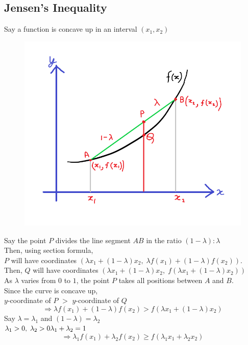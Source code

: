 \documentclass[14]{article}
\theoremstyle{definition}
\theoremstyle{case}
\begin{document}
\subsection{Jensen's Inequality}
Say a function is concave up in an interval $(x_1, x_2)$\\
\begin{figure}[h]
\includegraphics[scale=0.417]{images/jensen}
\end{figure}
Say the point $P$ divides the line segment $AB$ in the ratio $(1 - \lambda):\lambda$\\
Then, using section formula,\\
$P$ will have coordinates 
$\left( \lambda x_1 + (1 - \lambda) x_2,\; \lambda f(x_1) + (1 - \lambda) f(x_2) \right)$.\\
Then, $Q$ will have coordinates $\left( \lambda x_1 + (1 - \lambda) x_2,\; f\left(\lambda x_1 + (1 - \lambda) x_2\right) \right)$\\
As $\lambda$ varies from $0$ to $1$, the point $P$ takes all positions between $A$ and $B$.\\
Since the curve is concave up,\\
$y$-coordinate of $P$ $>$ $y$-coordinate of $Q$
\[\Rightarrow \lambda f(x_1) + (1 - \lambda) f(x_2) > f\left(\lambda x_1 + (1 - \lambda) x_2\right) \]
Say $\lambda = \lambda_1$ and $(1 - \lambda) = \lambda_2$\\
$\lambda_1 > 0, \; \lambda_2 > 0\\ \lambda_1 + \lambda_2 = 1$
\[\Rightarrow \lambda_1 f(x_1) + \lambda_2f(x_2) \geq f\left( \lambda_1 x_1 + \lambda_2x_2 \right)\]
\end{document}
